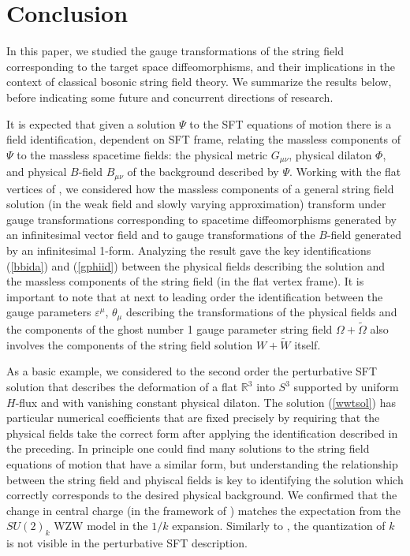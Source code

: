 \documentclass[12pt]{article}
\newcommand{\wt}[1]{\widetilde{#1}}
\begin{document}
\section{Conclusion}
\label{sec:conclusion}

In this paper, we studied the gauge transformations of the string field corresponding to the target space diffeomorphisms, and their implications in the context of classical bosonic string field theory. We summarize the results below, before indicating some future and concurrent directions of research.

It is expected that given a solution $\Psi$ to the SFT equations of motion there is a field identification, dependent on SFT frame, relating the massless components of $\Psi$ to the massless spacetime fields: the physical metric $G_{\mu \nu}$, physical dilaton $\Phi$, and physical $B$-field $B_{\mu \nu}$ of the background described by $\Psi$. Working with the flat vertices of \cite{Mazel:2024alu}, we considered how the massless components of a general string field solution (in the weak field and slowly varying approximation) transform under gauge transformations corresponding to spacetime diffeomorphisms generated by an infinitesimal vector field and to gauge transformations of the $B$-field generated by an infinitesimal 1-form. Analyzing the result gave the key identifications (\ref{bbida}) and (\ref{gphiid}) between the physical fields describing the solution and the massless components of the string field (in the flat vertex frame). It is important to note that at next to leading order the identification between the gauge parameters $\varepsilon^\mu$, $\theta_\mu$ describing the transformations of the physical fields and the components of the ghost number 1  gauge parameter string field $\Omega+\wt{\Omega}$ also involves the components of the string field solution $W+\wt{W}$ itself.

As a basic example, we considered to the second order the perturbative SFT solution that describes the deformation of a flat $\mathbb{R}^3$ into $S^3$ supported by uniform $H$-flux and with vanishing constant physical dilaton. The solution (\ref{wwtsol}) has particular numerical coefficients that are fixed precisely by requiring that the physical fields take the correct form after applying the identification described in the preceding. In principle one could find many solutions to the string field equations of motion that have a similar form, but understanding the relationship between the string field and phyiscal fields is key to identifying the solution which correctly corresponds to the desired physical background. We confirmed that the change in central charge (in the framework of \cite{Mazel:2024alu}) matches the expectation from the $SU(2)_k$ WZW model in the $1/k$ expansion. Similarly to \cite{Mazel:2024alu}, the quantization of $k$ is not visible in the perturbative SFT description.
\end{document}
